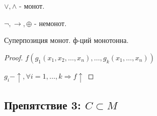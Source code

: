 \begin{example}
$\lor, \land$ - монот.

$\neg, \rightarrow, \oplus $ - немонот.
\end{example}
\begin{statement}
Суперпозиция монот. ф-ций монотонна.
\end{statement}
\begin{proof}
$f(g_1(x_1, x_2, \ldots, x_n), \ldots, g_k(x_1, \ldots, x_n))$

$g_i - \uparrow, \forall i = 1, \ldots , k \Rightarrow f \uparrow$
\end{proof}
\subsection{Препятствие 3: $C \subset M$}
